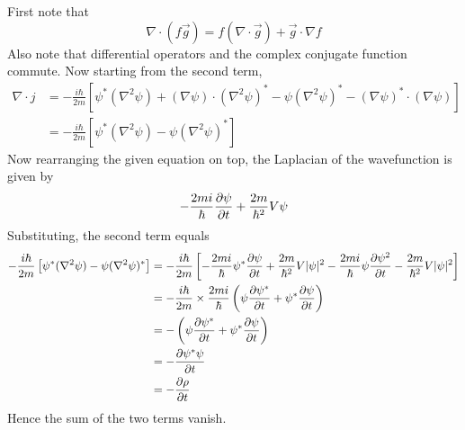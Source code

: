 \documentclass[answers]{exam}
\begin{document}
\begin{questions}
\begin{solution}
    First note that
    \begin{equation}
        \nabla \cdot (f\vec g) = f(\nabla \cdot \vec g) + \vec g \cdot \nabla f
    \end{equation}
    Also note that differential operators and the complex conjugate function commute. Now starting from the second term,
    \begin{align*}
        \nabla \cdot j &= -\frac{i\hbar}{2m} \left[\psi^*(\nabla^2\psi) + (\nabla\psi)\cdot(\nabla^2\psi)^* - \psi(\nabla^2\psi)^* - (\nabla\psi)^*\cdot(\nabla\psi)\right] \\
                       &= -\frac{i\hbar}{2m} \left[\psi^*(\nabla^2\psi) - \psi(\nabla^2\psi)^*\right]
    \end{align*}
    Now rearranging the given equation on top, the Laplacian of the wavefunction is given by
    \begin{equation}
        -\frac{2mi}{\hbar} \frac{\partial \psi}{\partial t} + \frac{2m}{\hbar^2} V\psi
    \end{equation}
    Substituting, the second term equals
    \begin{align*}
        -\frac{i\hbar}{2m} \left[\psi^*(\nabla^2\psi) - \psi(\nabla^2\psi)^*\right] &= -\frac{i\hbar}{2m} \left[-\frac{2mi}{\hbar}\psi^*\frac{\partial \psi}{\partial t} + \frac{2m}{\hbar^2}V|\psi|^2 - \frac{2mi}{\hbar} \psi\frac{\partial \psi^2}{\partial t} - \frac{2m}{\hbar^2} V|\psi|^2\right] \\
                                                                                    &= -\frac{i\hbar}{2m} \times \frac{2mi}{\hbar} \left(\psi\frac{\partial \psi^*}{\partial t} + \psi^*\frac{\partial \psi}{\partial t}\right) \\
                                                                                    &= -\left(\psi\frac{\partial \psi^*}{\partial t} + \psi^*\frac{\partial \psi}{\partial t}\right) \\
                                                                                    &= -\frac{\partial \psi^*\psi}{\partial t} \\
                                                                                    &= -\frac{\partial \rho}{\partial t}
    \end{align*}
    Hence the sum of the two terms vanish.
\end{solution}

\end{questions}
\end{document}
